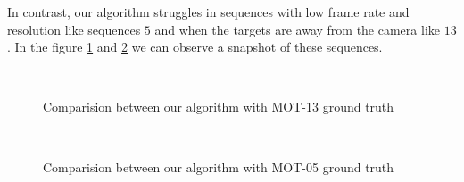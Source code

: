 In contrast, our algorithm struggles in sequences with low frame rate and resolution like sequences $5$ and when the targets are away from the camera like $13$. In the figure \ref{seq3} and \ref{seq4} we can observe a snapshot of these sequences.


\begin{figure}[H]
		
\centering

\\
\caption{Comparision between our algorithm with MOT-13 ground truth}
\label{seq3}
\end{figure}


\begin{figure}[H]
		
\centering

\\
\caption{Comparision between our algorithm with MOT-05 ground truth}
\label{seq4}
\end{figure}




